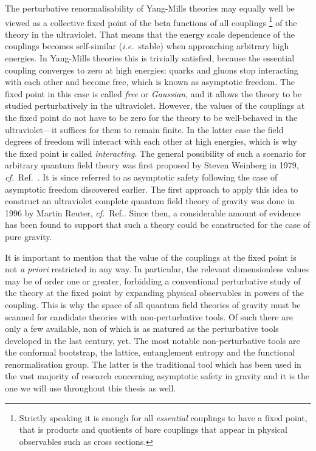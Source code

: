 \documentclass[11pt]{book}
\newcommand\apriori{\textit{a priori} }
\newcommand\ie{\textit{i.e.}\ }
\newcommand\cf{\textit{cf.}\ }
\numberwithin{equation}{chapter}
\begin{document}
The perturbative renormalisability of Yang-Mills theories may
equally well be viewed as
a collective fixed point of the beta functions of all couplings%
\footnote{%
  Strictly speaking it is enough for all \textit{essential} couplings
  to have a fixed point, that is products and quotients of bare couplings
  that appear in physical observables such as cross sections.
}
of the theory in the ultraviolet. That means that the energy scale dependence
of the couplings becomes self-similar (\ie stable) when approaching arbitrary
high energies. In Yang-Mills theories this is trivially satisfied, because
the essential coupling converges to zero at high energies: quarks and gluons stop interacting
with each other and become free, which is known as asymptotic freedom. The fixed
point in this case is called \textit{free} or \textit{Gaussian}, and it allows
the theory to be studied perturbatively in the ultraviolet. However, the values
of the couplings at the fixed point do not have to be zero for the theory to
be well-behaved in the ultraviolet---it suffices for them to remain finite.
In the latter case the field degrees of freedom will interact with each other at
high energies, which is why the fixed point is called \textit{interacting}.
The general possibility of such a scenario for arbitrary quantum field theory
was first proposed by Steven Weinberg in 1979, \cf Ref.~\cite{Weinberg:1980gg}.
It is since referred to as asymptotic safety following the case of asymptotic
freedom discovered earlier.
The first approach to apply this idea to construct an ultraviolet complete quantum
field theory of gravity was done in 1996 by Martin Reuter, \cf Ref.\cite{Reuter:1996cp}.
Since then, a considerable amount of evidence has been found to support that such
a theory could be constructed for the case of pure gravity.

It is important to mention that the value of the couplings at the fixed point is not
\apriori restricted in any way. In particular, the relevant dimensionless values
may be of order one or greater, forbidding a conventional perturbative study of the theory
at the fixed point by expanding physical observables in powers of the coupling.
This is why the space of all quantum field theories of gravity must be scanned for
candidate theories with non-perturbative tools. Of such there are only a few available,
non of which is as matured as the perturbative tools developed in the last century, yet.
The most notable non-perturbative tools are the conformal bootstrap,
the lattice, entanglement entropy and the functional renormalisation group.
The latter is the traditional tool which has been used in the vast majority
of research concerning asymptotic safety in gravity and it is the one we will use
throughout this thesis as well.
\end{document}
